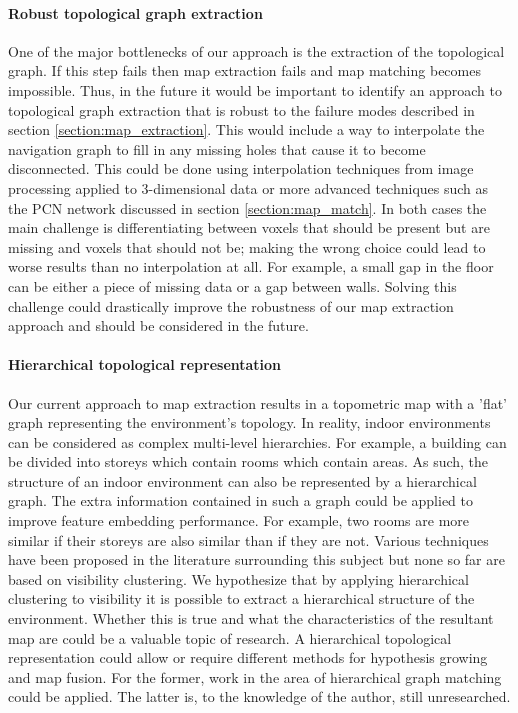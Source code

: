 \paragraph{Robust topological graph extraction}
One of the major bottlenecks of our approach is the extraction of the topological graph. If this step fails then map extraction fails and map matching becomes impossible. Thus, in the future it would be important to identify an approach to topological graph extraction that is robust to the failure modes described in section \ref{section:map_extraction}. This would include a way to interpolate the navigation graph to fill in any missing holes that cause it to become disconnected. This could be done using interpolation techniques from image processing applied to 3-dimensional data or more advanced techniques such as the PCN network discussed in section \ref{section:map_match}. In both cases the main challenge is differentiating between voxels that should be present but are missing and voxels that should not be; making the wrong choice could lead to worse results than no interpolation at all. For example, a small gap in the floor can be either a piece of missing data or a gap between walls. Solving this challenge could drastically improve the robustness of our map extraction approach and should be considered in the future.

\paragraph{Hierarchical topological representation}
Our current approach to map extraction results in a topometric map with a 'flat' graph representing the environment's topology. In reality, indoor environments can be considered as complex multi-level hierarchies. For example, a building can be divided into storeys which contain rooms which contain areas. As such, the structure of an indoor environment can also be represented by a hierarchical graph. The extra information contained in such a graph could be applied to improve feature embedding performance. For example, two rooms are more similar if their storeys are also similar than if they are not. Various techniques have been proposed in the literature surrounding this subject but none so far are based on visibility clustering. We hypothesize that by applying hierarchical clustering to visibility it is possible to extract a hierarchical structure of the environment. Whether this is true and what the characteristics of the resultant map are could be a valuable topic of research. A hierarchical topological representation could allow or require different methods for hypothesis growing and map fusion. For the former, work in the area of hierarchical graph matching could be applied. The latter is, to the knowledge of the author, still unresearched. 

